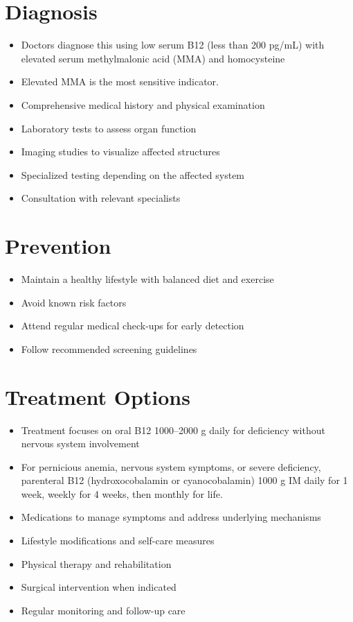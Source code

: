 \section{Diagnosis}
\begin{itemize}[noitemsep]
  \item Doctors diagnose this using low serum B12 (less than 200 pg/mL) with elevated serum methylmalonic acid (MMA) and homocysteine
  \item Elevated MMA is the most sensitive indicator.
  \item Comprehensive medical history and physical examination
  \item Laboratory tests to assess organ function
  \item Imaging studies to visualize affected structures
  \item Specialized testing depending on the affected system
  \item Consultation with relevant specialists
\end{itemize}
\section{Prevention}
\begin{itemize}[noitemsep]
  \item Maintain a healthy lifestyle with balanced diet and exercise
  \item Avoid known risk factors
  \item Attend regular medical check-ups for early detection
  \item Follow recommended screening guidelines
\end{itemize}
\section{Treatment Options}
\begin{itemize}[noitemsep]
  \item Treatment focuses on oral B12 1000--2000 \textmu g daily for deficiency without nervous system involvement
  \item For pernicious anemia, nervous system symptoms, or severe deficiency, parenteral B12 (hydroxocobalamin or cyanocobalamin) 1000 \textmu g IM daily for 1 week, weekly for 4 weeks, then monthly for life.
  \item Medications to manage symptoms and address underlying mechanisms
  \item Lifestyle modifications and self-care measures
  \item Physical therapy and rehabilitation
  \item Surgical intervention when indicated
  \item Regular monitoring and follow-up care
\end{itemize}
